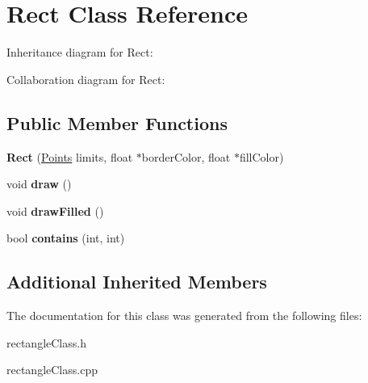 \hypertarget{classRect}{}\section{Rect Class Reference}
\label{classRect}


Inheritance diagram for Rect\+:


Collaboration diagram for Rect\+:
\subsection*{Public Member Functions}
\begin{DoxyCompactItemize}
\item 
{\bfseries Rect} (\hyperlink{structPoints}{Points} limits, float $\ast$border\+Color, float $\ast$fill\+Color)\hypertarget{classRect_a9309028ac05127b04803e7065f90ca5f}{}\label{classRect_a9309028ac05127b04803e7065f90ca5f}

\item 
void {\bfseries draw} ()\hypertarget{classRect_a8dcd19de13a2218bd44fc5759354341d}{}\label{classRect_a8dcd19de13a2218bd44fc5759354341d}

\item 
void {\bfseries draw\+Filled} ()\hypertarget{classRect_a62b62cd57fddf85634964afca9c96322}{}\label{classRect_a62b62cd57fddf85634964afca9c96322}

\item 
bool {\bfseries contains} (int, int)\hypertarget{classRect_af7e0643a08d83b975e03f653ad5935bd}{}\label{classRect_af7e0643a08d83b975e03f653ad5935bd}

\end{DoxyCompactItemize}
\subsection*{Additional Inherited Members}


The documentation for this class was generated from the following files\+:\begin{DoxyCompactItemize}
\item 
rectangle\+Class.\+h\item 
rectangle\+Class.\+cpp\end{DoxyCompactItemize}
